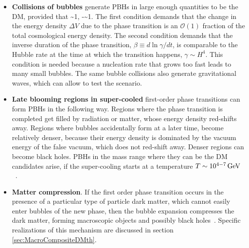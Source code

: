 \begin{itemize}
\item[$\circledcirc$] {\bf Collisions of bubbles} generate PBHs in large enough quantities to be the DM, provided that
\beq \alpha \equiv {}\sim 1,\qquad 
  \equiv  -\approx {}\sim 1.\eeq
The first condition demands that  the change in the energy density $\Delta V$ due to the phase transition  is an $\mathcal{O}(1)$ fraction of the total cosmological energy density.
The second condition demands that the inverse duration of the phase transition, $\beta \equiv d\ln \gamma/dt$,
is comparable to the Hubble rate at the time at which the transition happens, $\gamma \sim H^4$.
This condition is needed because a  nucleation rate that grows too fast leads to many small bubbles. 
The same bubble collisions also generate gravitational waves, which can allow to test the scenario.



\item[$\circledcirc$] {\bf Late blooming regions in super-cooled} first-order phase transitions can form PBHs in the following way.
Regions where the phase transition is completed get filled by radiation or matter, whose energy density red-shifts away.
Regions where bubbles accidentally form at a later time, become relatively denser, because their
energy density is dominated by the vacuum energy of the false vacuum, which does not red-shift away.
Denser regions can become black holes.
PBHs in the mass range where they can be the DM candidates arise, if the super-cooling starts at a temperature $T \sim 10^{4-7}\,{\rm GeV}$~\cite{PBHformationTh}.


 \item[$\circledcirc$] 
{\bf Matter compression}. 
If the first order phase transition occurs in the presence of a particular type of particle dark matter, which cannot easily enter bubbles of the new phase,
then the bubble expansion compresses the dark matter, forming macroscopic objects and possibly 
black holes~\cite{QballsBis}. Specific realizations of this mechanism are discussed in section \ref{sec:MacroCompositeDMth}.

 \end{itemize}

